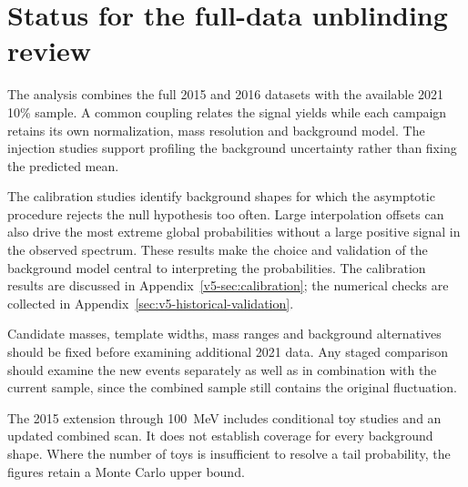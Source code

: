 \section{Status for the full-data unblinding review}
\label{sec:v5-review}

The analysis combines the full 2015 and 2016 datasets with the available
2021 10\% sample. A common coupling relates the signal yields while each
campaign retains its own normalization, mass resolution and background
model. The injection studies support profiling the background uncertainty
rather than fixing the predicted mean.

The calibration studies identify background shapes for which the asymptotic
procedure rejects the null hypothesis too often. Large interpolation offsets
can also drive the most extreme global probabilities without a large positive
signal in the observed spectrum. These results make the choice and validation
of the background model central to interpreting the probabilities. The
calibration results are discussed in Appendix~\ref{v5-sec:calibration};
the numerical checks are collected in
Appendix~\ref{sec:v5-historical-validation}.

Candidate masses, template widths, mass ranges and background alternatives
should be fixed before examining additional 2021 data. Any staged comparison
should examine the new events separately as well as in combination with the
current sample, since the combined sample still contains the original
fluctuation.

The 2015 extension through 100~MeV includes conditional toy studies and an
updated combined scan. It does not establish coverage for every background
shape. Where the number of toys is insufficient to resolve a tail probability,
the figures retain a Monte Carlo upper bound.
